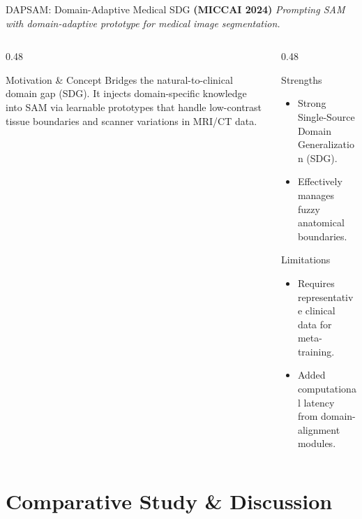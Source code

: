 \documentclass[aspectratio=169, 10pt]{beamer}
\begin{document}
\begin{frame}{DAPSAM: Domain-Adaptive Medical SDG \textbf{(MICCAI 2024)}}
\textit{Prompting SAM with domain-adaptive prototype for medical image segmentation.}
    \begin{columns}[T]
        \begin{column}{0.48\textwidth}
            \begin{block}{Motivation \& Concept \cite{wei2024prompting}}
                Bridges the natural-to-clinical domain gap (SDG). It injects domain-specific knowledge into SAM via learnable prototypes that handle low-contrast tissue boundaries and scanner variations in MRI/CT data.
            \end{block}
        \end{column}
        
        \begin{column}{0.48\textwidth}
            \begin{exampleblock}{Strengths}
                \begin{itemize}
                    \item[\textcolor{green!70!black}{\ding{51}}] Strong Single-Source Domain Generalization (SDG).
                    \item[\textcolor{green!70!black}{\ding{51}}] Effectively manages fuzzy anatomical boundaries.
                \end{itemize}
            \end{exampleblock}
            \begin{alertblock}{Limitations}
                \begin{itemize}
                    \item[\textcolor{red}{\ding{55}}] Requires representative clinical data for meta-training.
                    \item[\textcolor{red}{\ding{55}}] Added computational latency from domain-alignment modules.
                \end{itemize}
            \end{alertblock}
        \end{column}
    \end{columns}
\end{frame}





\section{Comparative Study \& Discussion}
\end{document}
